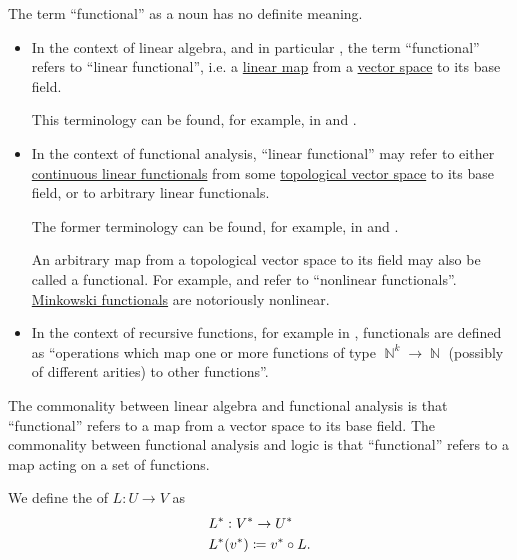 \begin{remark}\label{rem:functional}
  The term \enquote{functional} as a noun has no definite meaning.

  \begin{itemize}
    \item In the context of linear algebra, and in particular , the term \enquote{functional} refers to \enquote{linear functional}, i.e. a \hyperref[def:semimodule/homomorphism]{linear map} from a \hyperref[def:vector_space]{vector space} to its base field.

    This terminology can be found, for example, in \cite[50]{Knapp2016BasicAlgebra} and \cite[sec. 26.1]{Тыртышников2004Лекции}.

    \item In the context of functional analysis, \enquote{linear functional} may refer to either \hyperref[def:continuous_dual_space]{continuous linear functionals} from some \hyperref[def:topological_vector_space]{topological vector space} to its base field, or to arbitrary linear functionals.

    The former terminology can be found, for example, in \cite[def. 3.1]{Rudin1991Functional} and \cite[sec. 1.3]{Clarke2013}.

    An arbitrary map from a topological vector space to its field may also be called a functional. For example, \cite[102]{KufnerFucik1980} and \cite[223]{Deimling1985} refer to \enquote{nonlinear functionals}. \hyperref[def:minkowski_functional]{Minkowski functionals} are notoriously nonlinear.

    \item In the context of recursive functions, for example in \cite{StanfordPlato:recursive_functions}, functionals are defined as \enquote{operations which map one or more functions of type \( \BbbN^k \to \BbbN \) (possibly of different arities) to other functions}.
  \end{itemize}

  The commonality between linear algebra and functional analysis is that \enquote{functional} refers to a map from a vector space to its base field. The commonality between functional analysis and logic is that \enquote{functional} refers to a map acting on a set of functions.
\end{remark}

\begin{definition}\label{def:dual_linear_operator}\mimprovised
  We define the  of \( L: U \to V \) as
  \begin{equation*}
    \begin{aligned}
      &L^*: V^* \to U^* \\
      &L^*(v^*) \coloneqq v^* \bincirc L.
    \end{aligned}
  \end{equation*}
\end{definition}

